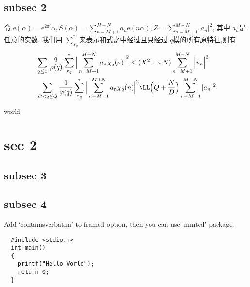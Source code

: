 \documentclass[aspectratio=169]{beamer}
\def\ee{\mathrm{e}}
\begin{document}
  \subsection{subsec 2}
  \begin{frame}
    \begin{lemma}[哥德巴赫]\upshape
      令 $\ee(\alpha) = \ee^{2\pi i}\alpha, S(\alpha) = \sum_{n=M+1}^{M+N}{a_n\ee(n\alpha)}, Z = \sum_{n=M+1}^{M+N}{|a_n|^2}$,
      其中 $a_n$是任意的实数. 我们用 $\sum_{\chi_q}^{*}$来表示和式之中经过且只经过 $q$模的所有原特征,则有
      \begin{align}
          & \sum_{q\leq x}\frac{q}{\varphi(q)}\sum_{x_{q}}^{*}\Big|\sum_{n=M+1}^{M+N}a_{n}\chi_{q}(n)\Big|^{2}\le (X^{2}+\pi N)\sum_{n=M+1}^{M+N}\Big|u_{n}\Big|^{2} \\
          & \sum_{D<q\leq Q}\frac{1}{\varphi(q)}\sum_{x_{q}}^{*}\Big|\sum_{n=M+1}^{M+N}a_{n}\chi_{q}(n)\Big|^{2}\LL\Big(Q+\frac{N}{D}\Big)\sum_{n=M+1}^{M+N}|a_{n}|^{2}
      \end{align}
    \end{lemma}
  \end{frame} 
  \begin{frame}
    world
  \end{frame} 

  \section{sec 2}
  \subsection{subsec 3}
  \subsection{subsec 4}

  \begin{frame}[containsverbatim]
  Add `containsverbatim' to framed option, then you can use `minted' package.
  \begin{verbatim}
  #include <stdio.h>
  int main()
  {
    printf("Hello World");
    return 0;
  }
  \end{verbatim}
  \end{frame} 
\end{document}
